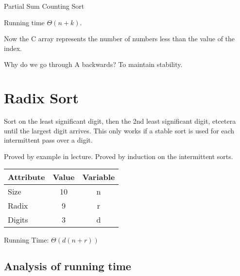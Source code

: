 \documentclass[english, 10pt]{article}
\begin{document}
\begin{algorithm}[H]
    \caption{Partial Sum Counting Sort}
\end{algorithm}

Running time $\Theta(n+k)$.

Now the C array represents the number of numbers less than the value of the index.

Why do we go through A backwards? To maintain stability.



\section{Radix Sort}
Sort on the least significant digit, then the 2nd least significant digit,
etcetera until the largest digit arrives. This only works if a stable sort is
used for each intermittent pass over a digit.

Proved by example in lecture. Proved by induction on the intermittent sorts.

\begin{tabular}{lcc}
    Attribute & Value & Variable \\ \toprule
    Size      & 10    & n \\ \midrule
    Radix     & 9     & r \\ \midrule
    Digits    & 3     & d \\ \midrule
\end{tabular}

Running Time: $\Theta(d(n+r))$

\subsection{Analysis of running time}
\end{document}
